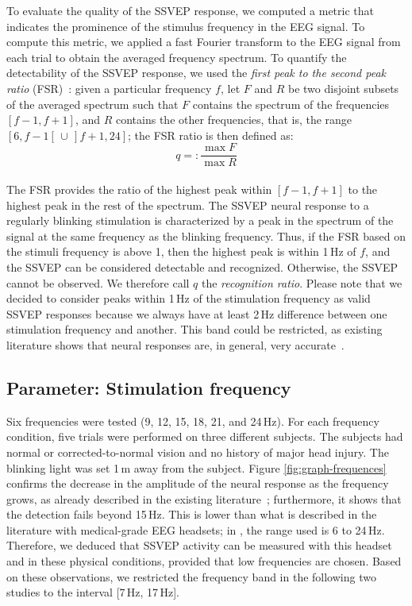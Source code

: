 \documentclass[smallextended]{svjour3}
\begin{document}
To evaluate the quality of the SSVEP response, we computed a metric that indicates the prominence of the stimulus frequency in the EEG signal.
To compute this metric, we applied a fast Fourier transform to the EEG signal from each trial to obtain the averaged frequency spectrum. 
To quantify the detectability of the SSVEP response, we used the \textit{first peak to the second peak ratio} (FSR)~\cite{Zheng2010}:
given a particular frequency $f$, let $F$ and $R$ be two disjoint subsets of the averaged spectrum such that $F$ contains the spectrum of the frequencies $[f-1, f+1]$, and $R$ contains the other frequencies, that is, the range $[6, f-1[ \,\cup\, ]f+1, 24]$; the FSR ratio is then defined as:
\begin{equation}
\label{recog_rat}
q =:\frac{\max F}{\max R}
\end{equation}
\\
The FSR provides the ratio of the highest peak within $[f-1, f+1]$ to the highest peak in the rest of the spectrum. 
The SSVEP neural response to a regularly blinking stimulation is characterized by a peak in the spectrum of the signal at the same frequency as the blinking frequency. 
Thus, if the FSR based on the stimuli frequency is above 1, then the highest peak is within 1\,Hz of $f$, and the SSVEP can be considered detectable and recognized. 
Otherwise, the SSVEP cannot be observed. 
We therefore call $q$ the \textit{recognition ratio}.
Please note that we decided to consider peaks within 1\,Hz of the stimulation frequency as valid SSVEP responses because we always have at least 2\,Hz difference between one stimulation frequency and another. 
This band could be restricted, as existing literature shows that neural responses are, in general, very accurate~\cite{SSVEPfiability}.

\subsection{Parameter: Stimulation frequency}
Six frequencies were tested (9, 12, 15, 18, 21, and 24\,Hz). For each frequency condition, five trials were performed on three different subjects. The subjects had normal or corrected-to-normal vision and no history of major head injury. The blinking light was set 1\,m away from the subject. 
Figure \ref{fig:graph-frequences} confirms the decrease in the amplitude of the neural response as the frequency grows, as already described in the existing literature~\cite{herrmann2001}; furthermore, it shows that the detection fails beyond 15\,Hz. 
This is lower than what is described in the literature with medical-grade EEG headsets; in \cite{SSVEPfiability}, the range used is 6 to 24\,Hz. Therefore, we deduced that SSVEP activity can be measured with this headset and in these physical conditions, provided that low frequencies are chosen.
Based on these observations, we restricted the frequency band in the following two studies to the interval [7\,Hz, 17\,Hz].
\end{document}
